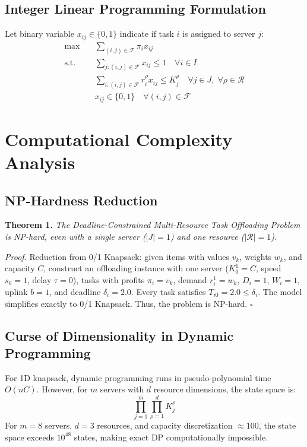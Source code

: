 \documentclass[conference,10pt]{IEEEtran}
\begin{document}
\subsection{Integer Linear Programming Formulation}
Let binary variable $x_{ij} \in \{0, 1\}$ indicate if task $i$ is assigned to server $j$:
\begin{align}
\max \quad & \sum_{(i,j) \in \mathcal{F}} \pi_i x_{ij} \\
\text{s.t.} \quad & \sum_{j : (i,j) \in \mathcal{F}} x_{ij} \le 1 \quad \forall i \in I \\
& \sum_{i : (i,j) \in \mathcal{F}} r_i^\rho x_{ij} \le K_j^\rho \quad \forall j \in J, \; \forall \rho \in \mathcal{R} \\
& x_{ij} \in \{0, 1\} \quad \forall (i, j) \in \mathcal{F}
\end{align}

\section{Computational Complexity Analysis}
\subsection{NP-Hardness Reduction}
\textbf{Theorem 1.} \textit{The Deadline-Constrained Multi-Resource Task Offloading Problem is NP-hard, even with a single server ($|J|=1$) and one resource ($|\mathcal{R}|=1$).}

\textit{Proof.} Reduction from 0/1 Knapsack: given items with values $v_k$, weights $w_k$, and capacity $C$, construct an offloading instance with one server ($K_0^1 = C$, speed $s_0=1$, delay $\tau=0$), tasks with profits $\pi_i = v_k$, demand $r_i^1 = w_k$, $D_i=1$, $W_i=1$, uplink $b=1$, and deadline $\delta_i=2.0$. Every task satisfies $T_{i0} = 2.0 \le \delta_i$. The model simplifies exactly to 0/1 Knapsack. Thus, the problem is NP-hard. $\square$

\subsection{Curse of Dimensionality in Dynamic Programming}
For 1D knapsack, dynamic programming runs in pseudo-polynomial time $O(nC)$. However, for $m$ servers with $d$ resource dimensions, the state space is:
\begin{equation}
\prod_{j=1}^m \prod_{\rho=1}^d K_j^\rho
\end{equation}
For $m=8$ servers, $d=3$ resources, and capacity discretization $\approx 100$, the state space exceeds $10^{48}$ states, making exact DP computationally impossible.
\end{document}
